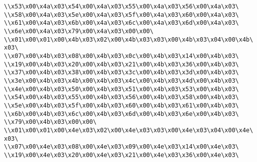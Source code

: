 \verb|\\x53\x00\x4a\x03\x54\x00\x4a\x03\x55\x00\x4a\x03\x56\x00\x4a\x03\|\newline
\verb|\\x58\x00\x4a\x03\x5e\x00\x4a\x03\x5f\x00\x4a\x03\x60\x00\x4a\x03\|\newline
\verb|\\x61\x00\x4a\x03\x6b\x00\x4a\x03\x6c\x00\x4a\x03\x6d\x00\x4a\x03\|\newline
\verb|\\x6e\x00\x4a\x03\x79\x00\x4a\x03\x00\x00\|\newline
\verb|\\x01\x00\x01\x00\x4b\x03\x02\x00\x4b\x03\x03\x00\x4b\x03\x04\x00\x4b\x03\|\newline
\verb|\\x07\x00\x4b\x03\x08\x00\x4b\x03\x0c\x00\x4b\x03\x14\x00\x4b\x03\|\newline
\verb|\\x19\x00\x4b\x03\x20\x00\x4b\x03\x21\x00\x4b\x03\x36\x00\x4b\x03\|\newline
\verb|\\x37\x00\x4b\x03\x38\x00\x4b\x03\x3c\x00\x4b\x03\x3d\x00\x4b\x03\|\newline
\verb|\\x3e\x00\x4b\x03\x4b\x00\x4b\x03\x4c\x00\x4b\x03\x4d\x00\x4b\x03\|\newline
\verb|\\x4e\x00\x4b\x03\x50\x00\x4b\x03\x51\x00\x4b\x03\x53\x00\x4b\x03\|\newline
\verb|\\x54\x00\x4b\x03\x55\x00\x4b\x03\x56\x00\x4b\x03\x58\x00\x4b\x03\|\newline
\verb|\\x5e\x00\x4b\x03\x5f\x00\x4b\x03\x60\x00\x4b\x03\x61\x00\x4b\x03\|\newline
\verb|\\x6b\x00\x4b\x03\x6c\x00\x4b\x03\x6d\x00\x4b\x03\x6e\x00\x4b\x03\|\newline
\verb|\\x79\x00\x4b\x03\x00\x00\|\newline
\verb|\\x01\x00\x01\x00\x4e\x03\x02\x00\x4e\x03\x03\x00\x4e\x03\x04\x00\x4e\x03\|\newline
\verb|\\x07\x00\x4e\x03\x08\x00\x4e\x03\x09\x00\x4e\x03\x14\x00\x4e\x03\|\newline
\verb|\\x19\x00\x4e\x03\x20\x00\x4e\x03\x21\x00\x4e\x03\x36\x00\x4e\x03\|\newline
